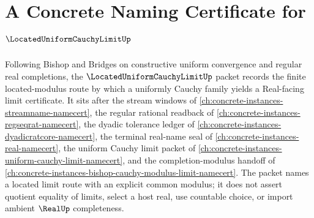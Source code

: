 \chapter{A Concrete Naming Certificate for $\LocatedUniformCauchyLimitUp$}
\label{ch:concrete-instances-located-uniform-cauchy-limit-namecert}

Following Bishop and Bridges on constructive uniform convergence and regular real completions, the $\LocatedUniformCauchyLimitUp$ packet records the finite located-modulus route by which a uniformly Cauchy family yields a Real-facing limit certificate. It sits after the stream windows of \autoref{ch:concrete-instances-streamname-namecert}, the regular rational readback of \autoref{ch:concrete-instances-regseqrat-namecert}, the dyadic tolerance ledger of \autoref{ch:concrete-instances-dyadicratcore-namecert}, the terminal real-name seal of \autoref{ch:concrete-instances-real-namecert}, the uniform Cauchy limit packet of \autoref{ch:concrete-instances-uniform-cauchy-limit-namecert}, and the completion-modulus handoff of \autoref{ch:concrete-instances-bishop-cauchy-modulus-limit-namecert}. The packet names a located limit route with an explicit common modulus; it does not assert quotient equality of limits, select a host real, use countable choice, or import ambient $\RealUp$ completeness.

